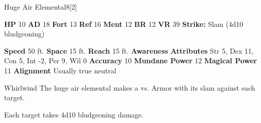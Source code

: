   \begin{monsubsection}{Huge Air Elemental}{8}[2]
    \vspace{-1em}\vspace{-1em}
    \vspace{0em}

    
    

    \begin{spellcontent}
      \begin{spelltargetinginfo}
        \pari \textbf{HP} 10 \monsep
          \textbf{AD} 18 \monsep
          \textbf{Fort} 13 \monsep
          \textbf{Ref} 16 \monsep
          \textbf{Ment} 12
        \pari \textbf{BR} 12 \monsep
        \textbf{VR} 39
        \pari \textbf{Strike:}
            Slam  (4d10 bludgeoning)
      \end{spelltargetinginfo}
    \end{spellcontent}
    \begin{monsterfooter}
      \pari \textbf{Speed} 50 ft. \monsep
        \textbf{Space} 15 ft. \monsep
        \textbf{Reach} 15 ft.
      \pari \textbf{Awareness} 
      \pari \textbf{Attributes}
        Str 5, Dex 11,
        Con 5, Int -2,
        Per 9, Wil 0
      \pari \textbf{Accuracy} 10 \monsep
        \textbf{Mundane Power} 12 \monsep
      \textbf{Magical Power} 11
      \pari \textbf{Alignment} Usually true neutral
    \end{monsterfooter}
  \end{monsubsection}
  \begin{freeability}{Whirlwind}
       The huge air elemental makes a 
         vs. Armor
        with its slam against each target.
    
    \hit Each target takes 4d10 bludgeoning damage.
    \end{freeability}
  

